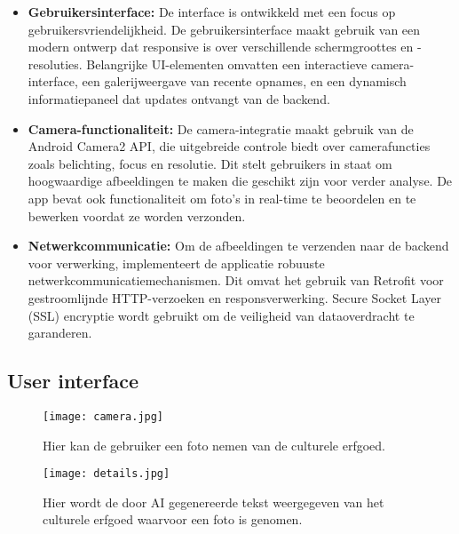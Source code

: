 \begin{itemize}
    \item \textbf{Gebruikersinterface:} De interface is ontwikkeld met een focus op gebruikersvriendelijkheid. De gebruikersinterface maakt gebruik van een modern ontwerp dat responsive is over verschillende schermgroottes en -resoluties. Belangrijke UI-elementen omvatten een interactieve camera-interface, een galerijweergave van recente opnames, en een dynamisch informatiepaneel dat updates ontvangt van de backend.
    
    \item \textbf{Camera-functionaliteit:} De camera-integratie maakt gebruik van de Android Camera2 API, die uitgebreide controle biedt over camerafuncties zoals belichting, focus en resolutie. Dit stelt gebruikers in staat om hoogwaardige afbeeldingen te maken die geschikt zijn voor verder analyse. De app bevat ook functionaliteit om foto's in real-time te beoordelen en te bewerken voordat ze worden verzonden.
    
    \item \textbf{Netwerkcommunicatie:} Om de afbeeldingen te verzenden naar de backend voor verwerking, implementeert de applicatie robuuste netwerkcommunicatiemechanismen. Dit omvat het gebruik van Retrofit voor gestroomlijnde HTTP-verzoeken en responsverwerking. Secure Socket Layer (SSL) encryptie wordt gebruikt om de veiligheid van dataoverdracht te garanderen.
    
\end{itemize}



\subsection{User interface}

\begin{figure}[h!]
    \centering
    \texttt{[image: camera.jpg]}
    \captionsetup{justification=centering}
    \caption{Hier kan de gebruiker een foto nemen van de culturele erfgoed.}
    \label{fig:FrontEndCamera}
\end{figure}
\begin{figure}[h!]
    \centering
    \texttt{[image: details.jpg]}
    \captionsetup{justification=centering}
    \caption{Hier wordt de door AI gegenereerde tekst weergegeven van het culturele erfgoed waarvoor een foto is genomen.}
    \label{fig:FrontEndCameraDetails}
\end{figure}
\pagebreak
